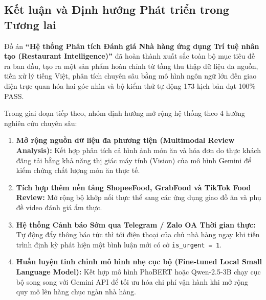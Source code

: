 \documentclass[12pt, a4paper]{article}
\begin{document}
\subsection{Kết luận và Định hướng Phát triển trong Tương lai}
Đồ án \textbf{``Hệ thống Phân tích Đánh giá Nhà hàng ứng dụng Trí tuệ nhân tạo (Restaurant Intelligence)''} đã hoàn thành xuất sắc toàn bộ mục tiêu đề ra ban đầu, tạo ra một sản phẩm hoàn chỉnh từ tầng thu thập dữ liệu đa nguồn, tiền xử lý tiếng Việt, phân tích chuyên sâu bằng mô hình ngôn ngữ lớn đến giao diện trực quan hóa hai góc nhìn và bộ kiểm thử tự động 173 kịch bản đạt 100\% PASS.

Trong giai đoạn tiếp theo, nhóm định hướng mở rộng hệ thống theo 4 hướng nghiên cứu chuyên sâu:
\begin{enumerate}[leftmargin=1.2cm]
    \item \textbf{Mở rộng nguồn dữ liệu đa phương tiện (Multimodal Review Analysis):} Kết hợp phân tích cả hình ảnh món ăn và hóa đơn do thực khách đăng tải bằng khả năng thị giác máy tính (Vision) của mô hình Gemini để kiểm chứng chất lượng món ăn thực tế.
    \item \textbf{Tích hợp thêm nền tảng ShopeeFood, GrabFood và TikTok Food Review:} Mở rộng bộ khớp nối thực thể sang các ứng dụng giao đồ ăn và phụ đề video đánh giá ẩm thực.
    \item \textbf{Hệ thống Cảnh báo Sớm qua Telegram / Zalo OA Thời gian thực:} Tự động đẩy thông báo tức thì tới điện thoại của chủ nhà hàng ngay khi tiến trình định kỳ phát hiện một bình luận mới có cờ \texttt{is\_urgent = 1}.
    \item \textbf{Huấn luyện tinh chỉnh mô hình nhẹ cục bộ (Fine-tuned Local Small Language Model):} Kết hợp mô hình PhoBERT hoặc Qwen-2.5-3B chạy cục bộ song song với Gemini API để tối ưu hóa chi phí vận hành khi mở rộng quy mô lên hàng chục ngàn nhà hàng.
\end{enumerate}
\end{document}
